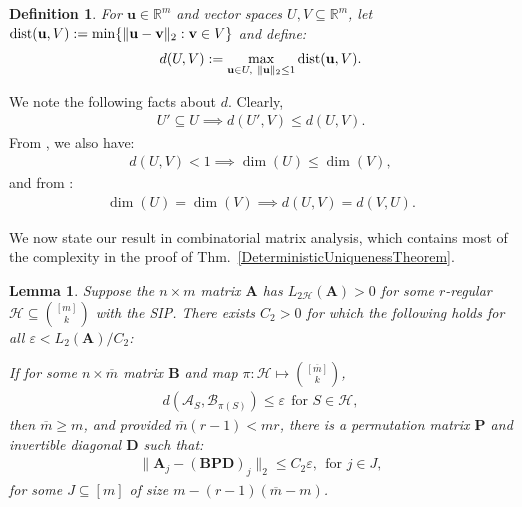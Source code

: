 \documentclass[journal, twocolumn]{IEEEtran}
\newtheorem{lemma}{Lemma}
\newtheorem{definition}{Definition}
\begin{document}
\begin{definition}\label{dDef}
For $\mathbf{u} \in \mathbb R^m$ and vector spaces $U,V \subseteq \mathbb{R}^m$, let $\text{\rm dist}(\mathbf{u}, V) := \min \{\| \mathbf{u}-\mathbf{v} \|_2: \mathbf{v} \in V\}$ and define:
\begin{align}
d(U,V) := \max_{\mathbf{u} \in U, \ \|\mathbf{u}\|_2 \leq 1} \text{\rm dist}(\mathbf{u},V).
\end{align}
\end{definition}

We note the following facts about $d$. Clearly, 
\begin{align}\label{UsubU}
U' \subseteq U \implies d(U',V) \leq d(U,V).
\end{align}
From \cite[Ch.~4 Cor.~2.6]{Kato2013}, we also have: %
\begin{align}\label{dimLem}
d(U,V) < 1 \implies \dim(U) \leq \dim(V),
\end{align}
and from \cite[Lem.~3.2]{Morris10}:
\begin{align}\label{eqdim}
\dim(U) = \dim(V) \implies d(U,V) = d(V,U).
\end{align}

We now state our result in combinatorial matrix analysis, which contains most of the complexity in the proof of Thm.~\ref{DeterministicUniquenessTheorem}. 

\begin{lemma}\label{MainLemma}
Suppose the $n \times m$ matrix $\mathbf{A}$ has $L_{2\mathcal{H}}(\mathbf{A}) > 0$ for some $r$-regular $\mathcal{H} \subseteq {[m] \choose k}$ with the SIP. There exists $C_2 > 0$ for which the following holds for all $\varepsilon < L_2(\mathbf{A}) / C_2$:

If for some $n \times \overline m$ matrix $\mathbf{B}$ and map $\pi: \mathcal{H} \mapsto {[\overline m] \choose k}$,
\begin{align}\label{GapUpperBound}
d(\bm{\mathcal{A}}_S, \bm{\mathcal{B}}_{\pi(S)}) \leq \varepsilon \ \  \text{for $S \in \mathcal{H}$},
\end{align}
then $\overline m \geq m$, and provided $\overline m (r-1) < mr$, there is a permutation matrix $\mathbf{P}$ and invertible diagonal $\mathbf{D}$ such that:
\begin{align}\label{MainLemmaBPD}
\|\mathbf{A}_j - (\mathbf{B}\mathbf{PD})_j\|_2 \leq C_2 \varepsilon, \ \  \text{for } j \in J,
\end{align}
for some $J \subseteq [m]$ of size \mbox{$m - (r-1)(\overline m - m)$}.
\end{lemma}
\end{document}
